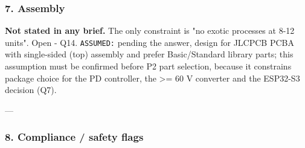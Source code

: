 \documentclass[11pt,a4paper]{article}
\begin{document}
\subsubsection*{7. Assembly}
\textbf{Not stated in any brief.} The only constraint is "no exotic processes at 8-12 units". Open - Q14. \texttt{ASSUMED:} pending the answer, design for JLCPCB PCBA with single-sided (top) assembly and prefer Basic/Standard library parts; this assumption must be confirmed before P2 part selection, because it constrains package choice for the PD controller, the \textgreater{}= 60 V converter and the ESP32-S3 decision (Q7).

---

\subsubsection*{8. Compliance / safety flags}
\end{document}
